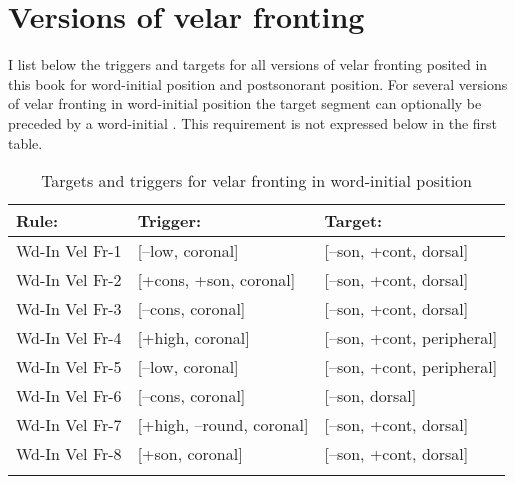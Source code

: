 \chapter{Versions of velar fronting}\label{appendix:d}

I list below the triggers and targets for all versions of velar fronting posited in this book for word-initial position and postsonorant position. For several versions of velar fronting in word-initial position the target segment can optionally be preceded by a word-initial . This requirement is not expressed below in the first table.

\begin{table}
\caption{Targets and triggers for velar fronting in word-initial position}
\begin{tabular}{lll}
\lsptoprule
Rule: & Trigger: & Target:\\\midrule
Wd-In Vel Fr-1 & [--low, coronal] & [--son, +cont, dorsal]\\
Wd-In Vel Fr-2 & [+cons, +son, coronal] & [--son, +cont, dorsal]\\
Wd-In Vel Fr-3 & [--cons, coronal] & [--son, +cont, dorsal]\\
Wd-In Vel Fr-4 & [+high, coronal] & [--son, +cont, peripheral]\\
Wd-In Vel Fr-5 & [--low, coronal] & [--son, +cont, peripheral]\\
Wd-In Vel Fr-6 & [--cons, coronal] & [--son, dorsal]\\
Wd-In Vel Fr-7 & [+high, --round, coronal] & [--son, +cont, dorsal]\\
Wd-In Vel Fr-8 & [+son, coronal] & [--son, +cont, dorsal]\\
\lspbottomrule
\end{tabular}
\end{table}

